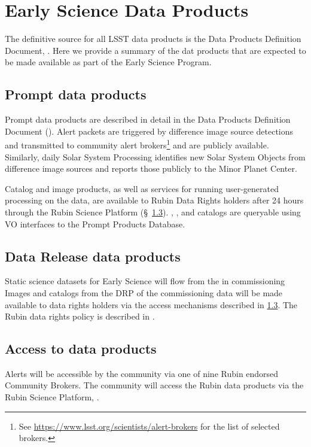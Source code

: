 \section{Early Science Data Products} 
\label{sec:data}

The definitive source for all LSST data products is the Data Products Definition Document, \citep{LSE-163}.
Here we provide a summary of the dat products that are expected to be made available as part of the Early Science Program. 

\subsection{Prompt data products}

Prompt data products are described in detail in the Data Products Definition Document (\DPDD).
Alert packets are triggered by difference image source detections and transmitted to community alert brokers\footnote{See \url{https://www.lsst.org/scientists/alert-brokers} for the list of selected brokers.} and are publicly available. 
Similarly, daily Solar System Processing identifies new Solar System Objects from difference image sources and reports those publicly to the Minor Planet Center.

Catalog and image products, as well as services for running user-generated processing on the data, are available to Rubin Data Rights holders after 24 hours through the Rubin Science Platform (\S~\ref{ssec:dataaccess}).
\DIASource, \DIAObject, and \SSObject catalogs are queryable using VO interfaces to the Prompt Products Database.

\subsection{Data Release data products}
Static science datasets for Early Science will flow from the \svs in commissioning
Images and catalogs from the DRP of the commissioning data will be made available to data rights holders via the access mechanisms described in \ref{ssec:dataaccess}.
The Rubin data rights policy is described in  \cite{RDO-013}.


\subsection{Access to \es data products}\label{ssec:dataaccess}
Alerts will be accessible by the community via one of nine Rubin endorsed Community Brokers. 
The community will access the Rubin data products via the Rubin Science Platform, \citep{LSE-319}.


